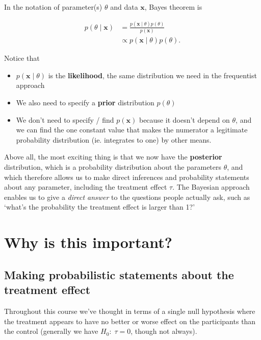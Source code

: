\documentclass[
  openany]{book}
\providecommand{\tightlist}{%
  \setlength{\itemsep}{0pt}\setlength{\parskip}{0pt}}
\theoremstyle{definition}
\theoremstyle{definition}
\theoremstyle{definition}
\theoremstyle{definition}
\theoremstyle{remark}
\begin{document}
In the notation of parameter(s) \(\theta\) and data \(\mathbf{x}\), Bayes theorem is

\begin{align*}
p\left(\theta\mid{\mathbf{x}}\right) &= \frac{p\left(\mathbf{x}\mid\theta\right)p\left(\theta\right)}{p\left(\mathbf{x}\right)}\\
&\propto p\left(\mathbf{x}\mid\theta\right)p\left(\theta\right).
\end{align*}

Notice that

\begin{itemize}
\tightlist
\item
  \(p\left(\mathbf{x}\mid\theta\right)\) is the \textbf{likelihood}, the same distribution we need in the frequentist approach
\item
  We also need to specify a \textbf{prior} distribution \(p\left(\theta\right)\)
\item
  We don't need to specify / find \(p\left(\mathbf{x}\right)\) because it doesn't depend on \(\theta\), and we can find the one constant value that makes the numerator a legitimate probability distribution (ie. integrates to one) by other means.
\end{itemize}

Above all, the most exciting thing is that we now have the \textbf{posterior} distribution, which is a probability distribution about the parameters \(\theta\), and which therefore allows us to make direct inferences and probability statements about any parameter, including the treatment effect \(\tau\). The Bayesian approach enables us to give a \emph{direct answer} to the questions people actually ask, such as `what's the probability the treatment effect is larger than 1?'

\section{Why is this important?}\label{why-is-this-important}

\subsection*{Making probabilistic statements about the treatment effect}\label{making-probabilistic-statements-about-the-treatment-effect}

Throughout this course we've thought in terms of a single null hypothesis where the treatment appears to have no better or worse effect on the participants than the control (generally we have \(H_0:\; \tau=0\), though not always).
\end{document}

